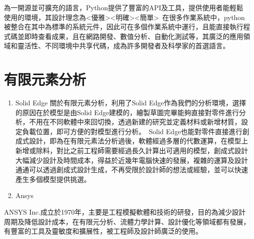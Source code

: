 為一開源並可擴充的語言，Python提供了豐富的API及工具，提供使用者能輕鬆使用的環境，其設計理念為<優雅><明確><簡單>\
在很多作業系統中，python被整合在其中為標準的系統元件，因此可在多個作業系統中運行，且能直接執行程式碼並即時查看成果，且在網路開發、數值分析、自動化測試等，其廣泛的應用領域和靈活性、不同環境中共享代碼，成為許多開發者及科學家的首選語言。\\

\section{有限元素分析}
\begin{enumerate}
\item Solid Edge
關於有限元素分析，利用了Solid Edge作為我們的分析環境，選擇的原因在於模型是由Solid Edge建模的，繪製草圖完畢能夠直接對零件進行分析，不用在不同軟體中來回切換，透過新建的研究並定義材料或新增材質，設定負載位置，即可方便的對模型進行分析。\
Solid Edge也能對零件直接進行創成式設計，即為在有限元素法分析過後，軟體經過多層的代數運算，在模型上新增或除料，對比之前工程師需要經過長久計算出可適用的模型，創成式設計大幅減少設計及時間成本，得益於近幾年電腦快速的發展，複雜的運算及設計通通可以透過創成式設計生成，不再受限於設計師的想法或經驗，並可以快速產生多個模型提供挑選。\
\item Ansys
\end{enumerate}
ANSYS Inc.成立於1970年，主要是工程模擬軟體和技術的研發，目的為減少設計周期及降低設計成本，在有限元分析、流體力學計算、設計優化等領域都有發展，有豐富的工具及靈敏度和擴展性，被工程師及設計師廣泛的使用。\\

\newpage
